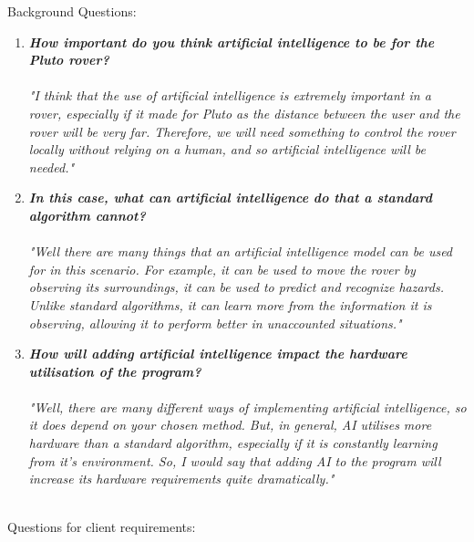 \documentclass[11pt]{report}
\begin{document}
			Background Questions:
				\begin{enumerate}
					\item{\emph{\textbf{How important do you think artificial intelligence to be for the Pluto rover?}}}\\\\
					\emph{"I think that the use of artificial intelligence is extremely important in a rover, especially if it made for Pluto as the distance between the user and the rover will be very far. Therefore, we will need something to control the rover locally without relying on a human, and so artificial intelligence will be needed."}
					\item{\emph{\textbf{In this case, what can artificial intelligence do that a standard algorithm cannot?}}}\\\\
					\emph{"Well there are many things that an artificial intelligence model can be used for in this scenario. For example, it can be used to move the rover by observing its surroundings, it can be used to predict and recognize hazards. Unlike standard algorithms, it can learn more from the information it is observing, allowing it to perform better in unaccounted situations."}
					\item{\emph{\textbf{How will adding artificial intelligence impact the hardware utilisation of the program?}}}\\\\
					\emph{"Well, there are many different ways of implementing artificial intelligence, so it does depend on your chosen method. But, in general, AI utilises more hardware than a standard algorithm, especially if it is constantly learning from it's environment. So, I would say that adding AI to the program will increase its hardware requirements quite dramatically."}
				\end{enumerate}
			~\\
			Questions for client requirements:
\end{document}
